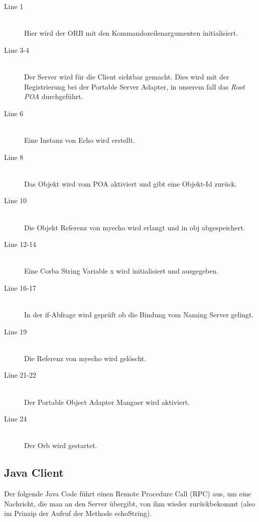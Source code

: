 \documentclass[11pt]{article}
\begin{document}
\begin{description}

\item[Line 1] \hfill \\
Hier wird der ORB mit den Kommandozeilenargumenten initialisiert.

\item[Line 3-4] \hfill \\
Der Server wird für die Client sichtbar gemacht. Dies wird mit der Registrierung bei der Portable Server Adapter, in unserem fall das \textit{Root POA} durchgeführt.

\item[Line 6] \hfill \\
Eine Instanz von Echo wird erstellt.

\item[Line 8] \hfill \\
Das Objekt wird vom POA aktiviert und gibt eine Objekt-Id zurück.

\item[Line 10] \hfill \\
Die Objekt Referenz von myecho wird erlangt und in obj abgespeichert.

\item[Line 12-14] \hfill \\
Eine Corba String Variable x wird initialisiert und ausgegeben. 

\item[Line 16-17] \hfill \\
In der if-Abfrage wird geprüft ob die Bindung vom Naming Server gelingt.

\item[Line 19] \hfill \\
Die Referenz von myecho wird gelöscht.

\item[Line 21-22] \hfill \\
Der Portable Object Adapter Mangaer wird aktiviert.

\item[Line 24] \hfill \\
Der Orb wird gestartet.

\end{description}

\subsection{Java Client}

Der folgende Java Code führt einen Remote Procedure Call (RPC) aus, um eine Nachricht, die man an den Server übergibt, von ihm wieder zurückbekommt (also im Prinzip der Aufruf der Methode echoString).
\end{document}
